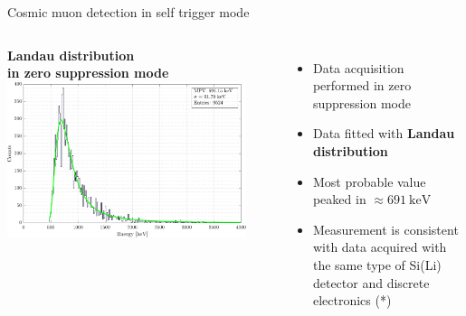 \documentclass[aspectratio=169,xcolor=dvipsnames,handout]{beamer} %
\newcommand{\greencheck}{{\color{ForestGreen}\checkmark}}
\begin{document}
\begin{frame}{Cosmic muon detection in self trigger mode}
\begin{columns}[T]
            
            
            \centering
            \fontsize{9pt}{1}\selectfont
            \vskip-0.1cm
            \textbf{Landau distribution\\ in zero suppression mode}
            \includegraphics[width=0.9\textwidth]{images/muon_detection/incoming_energy_thr130_ZS_landau_keV.pdf}

             \fontsize{8.5pt}{1}\selectfont
            \vspace{0.1cm}
            \begin{itemize}
                \item Data acquisition performed in zero suppression mode
                \item Data fitted with \textbf{Landau distribution}
                \item Most probable value peaked in \textbf{$\approx \SI{691}{\kilo\electronvolt}$} \greencheck
                \item Measurement is consistent with data acquired with the same type of Si(Li) detector and discrete electronics (*) \greencheck
            \end{itemize}
        
    \end{columns}
\end{frame}


\end{document}
